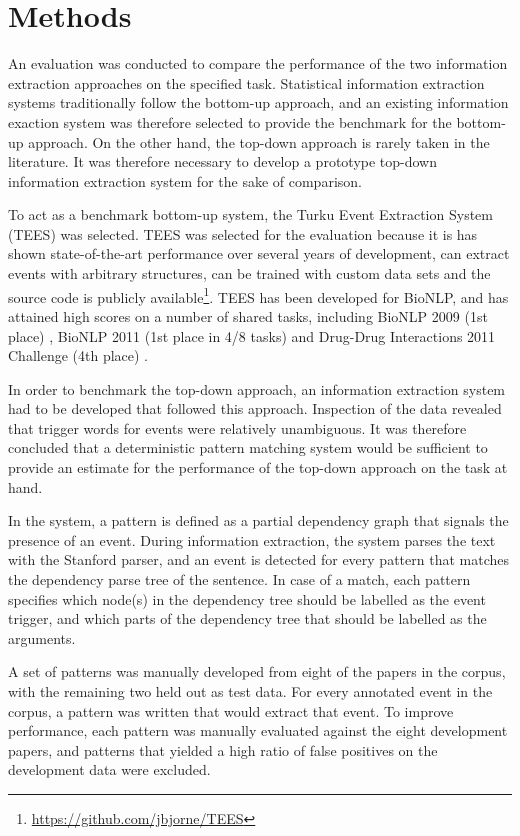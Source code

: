 \section{Methods}

An evaluation was conducted to compare the performance of the two information extraction approaches on the specified task. Statistical information extraction systems traditionally follow the bottom-up approach, and an existing information exaction system was therefore selected to provide the benchmark for the bottom-up approach. On the other hand, the top-down approach is rarely taken in the literature. It was therefore necessary to develop a prototype top-down information extraction system for the sake of comparison.

To act as a benchmark bottom-up system, the Turku Event Extraction System (TEES) \citep{bjö11ddi} was selected. TEES was selected for the evaluation because it is has shown state-of-the-art performance over several years of development, can extract events with arbitrary structures, can be trained with custom data sets and the source code is publicly available\footnote{\url{https://github.com/jbjorne/TEES}}. TEES has been developed for BioNLP, and has attained high scores on a number of shared tasks, including BioNLP 2009 (1st place) \citep{bjö09}, BioNLP 2011 (1st place in 4/8 tasks) \citep{bjö11} and Drug-Drug Interactions 2011 Challenge (4th place) \citep{bjö11ddi}.


In order to benchmark the top-down approach, an information extraction system had to be developed that followed this approach. Inspection of the data revealed that trigger words for events were relatively unambiguous. It was therefore concluded that a deterministic pattern matching system would be sufficient to provide an estimate for the performance of the top-down approach on the task at hand.

In the system, a pattern is defined as a partial dependency graph that signals the presence of an event. During information extraction, the system parses the text with the Stanford parser\citep{kle03}, and an event is detected for every pattern that matches the dependency parse tree of the sentence. In case of a match, each pattern specifies which node(s) in the dependency tree should be labelled as the event trigger, and which parts of the dependency tree that should be labelled as the arguments. 

A set of patterns was manually developed from eight of the papers in the corpus, with the remaining two held out as test data. For every annotated event in the corpus, a pattern was written that would extract that event. To improve performance, each pattern was manually evaluated against the eight development papers, and patterns that yielded a high ratio of false positives on the development data were excluded.

